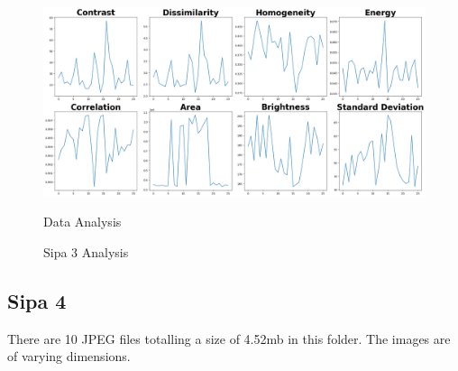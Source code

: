 \begin{figure}[ht]
\begin{minipage}[t]{0.50\textwidth}
        \centering
        \includegraphics[width=\textwidth]{Figures/EDA_Charts/3/da.png}
        \caption*{Data Analysis}
    \end{minipage}
    \caption{Sipa 3 Analysis}
    \label{fig:Sipa 3 Analysis}
\end{figure}

\newpage

\subsection{Sipa 4}


There are 10 JPEG files totalling a size of 4.52mb in this folder. The images are of varying dimensions.

